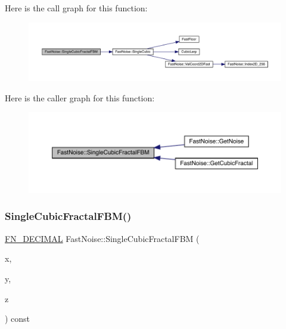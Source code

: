 Here is the call graph for this function\+:
\nopagebreak
\begin{figure}[H]
\begin{center}
\leavevmode
\includegraphics[width=350pt]{class_fast_noise_a892cdc836d7704acfbf8c3680a1a2689_cgraph}
\end{center}
\end{figure}
Here is the caller graph for this function\+:
\nopagebreak
\begin{figure}[H]
\begin{center}
\leavevmode
\includegraphics[width=350pt]{class_fast_noise_a892cdc836d7704acfbf8c3680a1a2689_icgraph}
\end{center}
\end{figure}
\mbox{\label{class_fast_noise_a6334e559478fb891e31e305d64c0c31d}} 
\subsubsection{\texorpdfstring{Single\+Cubic\+Fractal\+F\+B\+M()}{SingleCubicFractalFBM()}\hspace{0.1cm}{\footnotesize\ttfamily [2/2]}}
{\footnotesize\ttfamily \mbox{\hyperlink{_fast_noise_8h_a75a9ef6d2541c4921815b885bfd449c3}{F\+N\+\_\+\+D\+E\+C\+I\+M\+AL}} Fast\+Noise\+::\+Single\+Cubic\+Fractal\+F\+BM (\begin{DoxyParamCaption}\item[{\mbox{\hyperlink{_fast_noise_8h_a75a9ef6d2541c4921815b885bfd449c3}{F\+N\+\_\+\+D\+E\+C\+I\+M\+AL}}}]{x,  }\item[{\mbox{\hyperlink{_fast_noise_8h_a75a9ef6d2541c4921815b885bfd449c3}{F\+N\+\_\+\+D\+E\+C\+I\+M\+AL}}}]{y,  }\item[{\mbox{\hyperlink{_fast_noise_8h_a75a9ef6d2541c4921815b885bfd449c3}{F\+N\+\_\+\+D\+E\+C\+I\+M\+AL}}}]{z }\end{DoxyParamCaption}) const\hspace{0.3cm}{\ttfamily [private]}}

